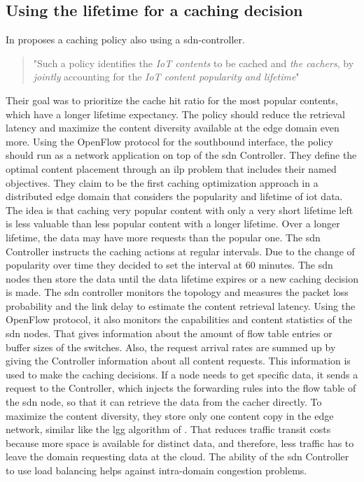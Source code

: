 \documentclass[conference]{IEEEtran}
\begin{document}
	\subsection{Using the lifetime for a caching decision}
	\label{sec:lifetime-caching}

	In \citeyear{caching-2} \cite{caching-2} proposes a caching policy also using a \ac{sdn}-controller. 
	\begin{quote}
		"Such a policy identifies the \textit{IoT contents} to be cached and \textit{the cachers}, by \textit{jointly} accounting for the \textit{IoT content popularity and lifetime}" \cite{caching-2} 
	\end{quote}

	Their goal was to prioritize the cache hit ratio for the most popular contents, which have a longer lifetime expectancy. The policy should reduce the retrieval latency and maximize the content diversity available at the edge domain even more. Using the OpenFlow protocol for the southbound interface, the policy should run as a network application on top of the \ac{sdn} Controller. They define the optimal content placement through an \ac{ilp} problem that includes their named objectives. They claim to be the first caching optimization approach in a distributed edge domain that considers the popularity and lifetime of \ac{iot} data. The idea is that caching very popular content with only a very short lifetime left is less valuable than less popular content with a longer lifetime. Over a longer lifetime, the data may have more requests than the popular one.
 	The \ac{sdn} Controller instructs the caching actions at regular intervals. Due to the change of popularity over time \cite{caching-5} they decided to set the interval at 60 minutes. The \ac{sdn} nodes then store the data until the data lifetime expires or a new caching decision is made. The \ac{sdn} controller monitors the topology and measures the packet loss probability and the link delay to estimate the content retrieval latency. Using the OpenFlow protocol, it also monitors the capabilities and content statistics of the \ac{sdn} nodes. That gives information about the amount of flow table entries or buffer sizes of the switches. Also, the request arrival rates are summed up by giving the Controller information about all content requests. This information is used to make the caching decisions. If a node needs to get specific data, it sends a request to the Controller, which injects the forwarding rules into the flow table of the \ac{sdn} node, so that it can retrieve the data from the cacher directly. To maximize the content diversity, they store only one content copy in the edge network, similar like the \ac{lgg} algorithm of \cite{caching-8}. That reduces traffic transit costs because more space is available for distinct data, and therefore, less traffic has to leave the domain requesting data at the cloud. The ability of the \ac{sdn} Controller to use load balancing helps against intra-domain congestion problems. 
\end{document}

